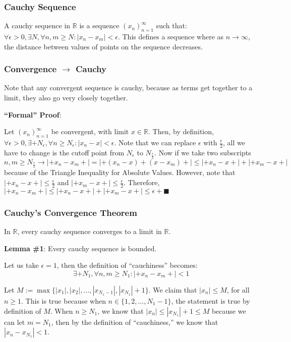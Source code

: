 \subsubsection{Cauchy Sequence}
A cauchy sequence in $\mathbb{R}$ is a sequence $(x_n)^\infty_{n=1}$ such that: $\forall \epsilon > 0, \exists N, \forall n, m \geq N: |x_n - x_m| < \epsilon$. This defines a sequence where as $n \to \infty$, the distance between values of points on the sequence decreases.

\subsubsection{Convergence $\to$ Cauchy}
Note that any convergent sequence is cauchy, because as terms get together
to a limit, they also go very closely together.

\textbf{``Formal'' Proof}:

Let $(x_n)_{n = 1}^\infty$ be convergent, with limit $x \in \mathbb{R}$.
Then, by definition, $\forall \epsilon > 0, \exists+ N_\epsilon, \forall
n \geq N_\epsilon :
|x_n - x| < \epsilon$. Note that we can replace $\epsilon$ with
$\frac{\epsilon}{2}$, all we have to change is the cutoff point from
$N_{\epsilon}$ to $N_{\frac{\epsilon}{2}}$. Now if we take two subscripts
$n, m \geq N_{\frac{\epsilon}{2}} \longrightarrow |+x_n - x_m+| = |+(x_n -
x) + (x - x_m)+| \leq |+x_n - x+| + |+x_m - x+|$ because of the Triangle
Inequality for Absolute Values. However, note that $|+x_n - x+| \leq
\frac{\epsilon}{2}$ and $|+x_m - x+| \leq \frac{\epsilon}{2}$.
Therefore, $|+x_n - x_m+| \leq |+x_n - x+| + |+x_m - x+| \leq \epsilon
+\blacksquare$

\subsubsection{Cauchy's Convergence Theorem}

In $\mathbb{R}$, every cauchy sequence converges to a limit in $\mathbb{R}$.

\vspace{0.3cm}

\textbf{Lemma \#1}: Every cauchy sequence is bounded.

Let us take $\epsilon = 1$, then the definition of ``cauchiness'' becomes:
$$\exists+ N_1, \forall n, m \geq N_1 : |+x_n - x_m+| < 1$$

Let $M := \max\{|x_1|, |x_2|, \dots, |x_{N_1 - 1}|, |x_{N_1}| + 1\}$. We claim
that $|x_n| \leq M$, for all $n \geq 1$. This is true because when $n \in \{1, 2, \dots, N_1
- 1\}$, the statement is true by definition of $M$. When $n \geq N_1$, we know
that $|x_n| \leq |x_{N_1}| + 1 \leq M$ because we can let $m = N_1$, then by the
definition of ``cauchiness,'' we know that $|x_n - x_{N_1}| < 1$.

